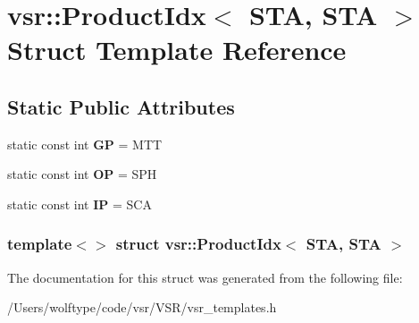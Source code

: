 \hypertarget{structvsr_1_1_product_idx_3_01_s_t_a_00_01_s_t_a_01_4}{\section{vsr\-:\-:Product\-Idx$<$ S\-T\-A, S\-T\-A $>$ Struct Template Reference}
\label{structvsr_1_1_product_idx_3_01_s_t_a_00_01_s_t_a_01_4}
}
\subsection*{Static Public Attributes}
\begin{DoxyCompactItemize}
\item 
\hypertarget{structvsr_1_1_product_idx_3_01_s_t_a_00_01_s_t_a_01_4_ad5d30f62638405c27f28f86ff537180e}{static const int {\bfseries G\-P} = M\-T\-T}\label{structvsr_1_1_product_idx_3_01_s_t_a_00_01_s_t_a_01_4_ad5d30f62638405c27f28f86ff537180e}

\item 
\hypertarget{structvsr_1_1_product_idx_3_01_s_t_a_00_01_s_t_a_01_4_a32742b0c9cb9af4f13961b35161f3640}{static const int {\bfseries O\-P} = S\-P\-H}\label{structvsr_1_1_product_idx_3_01_s_t_a_00_01_s_t_a_01_4_a32742b0c9cb9af4f13961b35161f3640}

\item 
\hypertarget{structvsr_1_1_product_idx_3_01_s_t_a_00_01_s_t_a_01_4_a4f1e249af1d3a707f3bc27c20ce70cd0}{static const int {\bfseries I\-P} = S\-C\-A}\label{structvsr_1_1_product_idx_3_01_s_t_a_00_01_s_t_a_01_4_a4f1e249af1d3a707f3bc27c20ce70cd0}

\end{DoxyCompactItemize}
\subsubsection*{template$<$$>$ struct vsr\-::\-Product\-Idx$<$ S\-T\-A, S\-T\-A $>$}



The documentation for this struct was generated from the following file\-:\begin{DoxyCompactItemize}
\item 
/\-Users/wolftype/code/vsr/\-V\-S\-R/vsr\-\_\-templates.\-h\end{DoxyCompactItemize}
